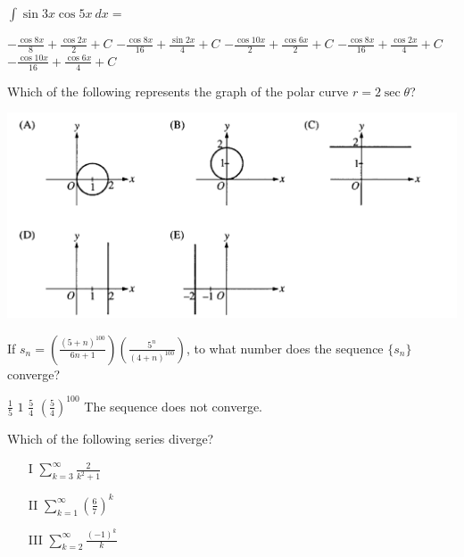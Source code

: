 \begin{questions}
\question[2] $\int \sin 3x \cos 5x\ dx = $

    \begin{oneparchoices}
    \choice $-\frac{\cos 8x}{8} + \frac{\cos 2x}{2} + C$
    \choice $-\frac{\cos 8x}{16} + \frac{\sin 2x}{4} + C$
    \choice $-\frac{\cos 10x}{2} + \frac{\cos 6x}{2} + C$
    \CorrectChoice $-\frac{\cos 8x}{16} + \frac{\cos 2x}{4} + C$
    \choice $-\frac{\cos 10x}{16} + \frac{\cos 6x}{4} + C$
    \end{oneparchoices}

\question[2] Which of the following represents the graph of the polar
    curve $r = 2\sec \theta$?

    \includegraphics[scale=0.7]{BC5.png}    

\question[2] If $s_n =
(\frac{(5+n)^{100}}{6{n+1}})(\frac{5^n}{(4+n)^{100}})$, to what number
does the sequence $\{s_n\}$ converge?

    \begin{oneparchoices}
    \CorrectChoice $\frac{1}{5}$
    \choice $1$
    \choice $\frac{5}{4}$
    \choice $(\frac{5}{4})^{100}$
    \choice The sequence does not converge.
    \end{oneparchoices}

\question[2] Which of the following series diverge?
            
    \begin{enumerate}
    \item[I] $\sum_{k = 3}^\infty \frac{2}{k^2 + 1}$
    \item[II] $\sum_{k = 1}^\infty (\frac{6}{7})^k$
    \item[III] $\sum_{k = 2}^\infty \frac{(-1)^k}{k}$
    \end{enumerate}


\end{questions}
